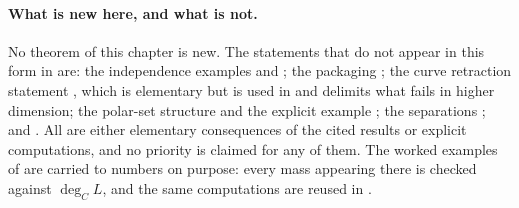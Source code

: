 \paragraph{What is new here, and what is not.}
No theorem of this chapter is new.  The statements that do not appear in
this form in \cite{BFJ16} are: the independence examples
 and
; the packaging
; the curve retraction statement
, which is elementary but is used in
 and delimits what fails in higher dimension; the
polar-set structure  and the explicit
example ; the separations
; and .  All
are either elementary consequences of the cited results or explicit
computations, and no priority is claimed for any of them.  The worked
examples of  are carried to numbers on purpose: every
mass appearing there is checked against \(\deg_CL\), and the same
computations are reused in .
